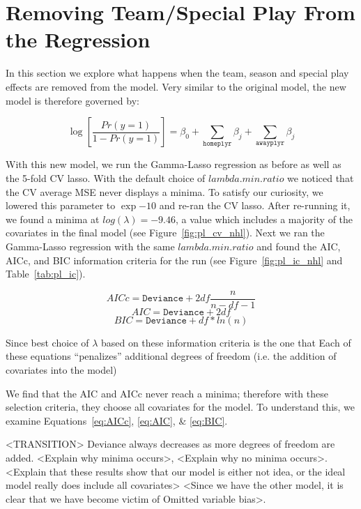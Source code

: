 \documentclass[11pt, fleqn]{article}
\begin{document}


\section{Removing Team/Special Play From the Regression}

In this section we explore what happens when the team, season and special play effects are removed from the model.  Very similar to the original model, the new model is therefore governed by:

\[ \log\left[\frac{Pr(y=1)}{1-Pr(y=1)}\right] = \beta_0 + \sum_{\texttt{homeplyr}} \beta_j + \sum_{\texttt{awayplyr}} \beta_j \]

With this new model, we run the Gamma-Lasso regression as before as well as the 5-fold CV lasso.  With the default choice of $lambda.min.ratio$ we noticed that the CV average MSE never displays a minima.  To satisfy our curiosity, we lowered this parameter to $\exp{-10}$ and re-ran the CV lasso.  After re-running it, we found a minima at $log(\lambda)=-9.46$, a value which includes a majority of the covariates in the final model (see Figure~\vref{fig:pl_cv_nhl}).  Next we ran the Gamma-Lasso regression with the same $lambda.min.ratio$ and found the AIC, AICc, and BIC information criteria for the run (see Figure~\vref{fig:pl_ic_nhl} and Table~\vref{tab:pl_ic}).

\begin{equation}
  AICc = \texttt{Deviance} + 2df\frac{n}{n-df-1}
  \label{eq:AICc}
\end{equation}
\begin{equation}
  AIC = \texttt{Deviance} + 2df
  \label{eq:AIC}
\end{equation}
\begin{equation}
  BIC = \texttt{Deviance} + df * ln(n)
  \label{eq:BIC}
\end{equation}

Since best choice of $\lambda$ based on these information criteria is the one that 
Each of these equations ``penalizes'' additional degrees of freedom (i.e. the addition of covariates into the model) 

We find that the AIC and AICc never reach a minima; therefore with these selection criteria, they choose all covariates for the model. To understand this, we examine Equations~\eqref{eq:AICc}, \eqref{eq:AIC}, \& \eqref{eq:BIC}.

<TRANSITION> Deviance always decreases as more degrees of freedom are added.  <Explain why minima occurs>, <Explain why no minima occurs>.  <Explain that these results show that our model is either not idea, or the ideal model really does include all covariates> <Since we have the other model, it is clear that we have become victim of Omitted variable bias>.
\end{document}
